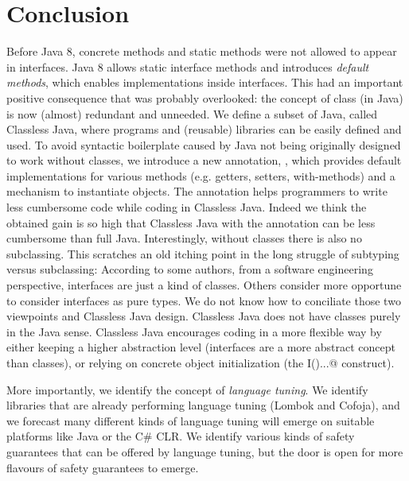 \section{Conclusion}\label{sec:conclusion}

Before Java 8, concrete methods and static methods were not allowed
to appear in interfaces.  Java 8 allows static interface methods and
introduces \emph{default methods}, which enables implementations
inside interfaces. This had an important positive consequence that
was probably overlooked: the concept of class
(in Java) is now (almost) redundant and unneeded.  We define a subset of Java,
called Classless Java, where programs and (reusable) libraries can be
easily defined and used.  To avoid syntactic boilerplate
caused by Java not being originally designed to work without classes,
we introduce a new annotation, \mixin, which provides default implementations
for various methods (e.g. getters, setters, with-methods) and a
mechanism to instantiate objects. The \mixin annotation helps programmers
to write less cumbersome code while coding in Classless Java. Indeed
we think the obtained gain is so high that Classless Java with the \mixin
annotation can be less cumbersome than full Java.
Interestingly, without classes there is also no subclassing. This scratches an old
  itching point in the long struggle of subtyping versus subclassing:
  According to some authors, from a software engineering perspective,
  interfaces are just a kind of classes. Others consider more
  opportune to consider interfaces as pure types. We do not know how to conciliate
  those two viewpoints and Classless Java design.
  Classless Java does not have classes purely in the Java sense.  
 Classless Java encourages coding in a more flexible way by either
 keeping a higher abstraction level (interfaces are a more abstract
 concept than classes), or relying on concrete object initialization
 (the \Q@new I(){...}@ construct).
 
 More importantly, we identify the concept of \emph{language tuning}.
 We identify libraries that are already performing language tuning (Lombok and Cofoja), and 
 we forecast many different kinds of language tuning will emerge on suitable platforms like Java or the C\# CLR.
 We identify various kinds of safety guarantees that can be offered by language tuning, but the door is open for more flavours of safety guarantees to emerge.
